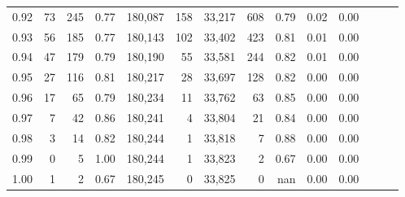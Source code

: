\begin{tabular}{rrrrrrrrrrrrrr}
0.92 &     73 &  245 &  0.77 &  180,087 &      158 &  33,217 &     608 &  0.79 &  0.02 &      0.00 \\
0.93 &     56 &  185 &  0.77 &  180,143 &      102 &  33,402 &     423 &  0.81 &  0.01 &      0.00 \\
0.94 &     47 &  179 &  0.79 &  180,190 &       55 &  33,581 &     244 &  0.82 &  0.01 &      0.00 \\
0.95 &     27 &  116 &  0.81 &  180,217 &       28 &  33,697 &     128 &  0.82 &  0.00 &      0.00 \\
0.96 &     17 &   65 &  0.79 &  180,234 &       11 &  33,762 &      63 &  0.85 &  0.00 &      0.00 \\
0.97 &      7 &   42 &  0.86 &  180,241 &        4 &  33,804 &      21 &  0.84 &  0.00 &      0.00 \\
0.98 &      3 &   14 &  0.82 &  180,244 &        1 &  33,818 &       7 &  0.88 &  0.00 &      0.00 \\
0.99 &      0 &    5 &  1.00 &  180,244 &        1 &  33,823 &       2 &  0.67 &  0.00 &      0.00 \\
1.00 &      1 &    2 &  0.67 &  180,245 &        0 &  33,825 &       0 &   nan &  0.00 &      0.00 \\
\bottomrule
\end{tabular}

